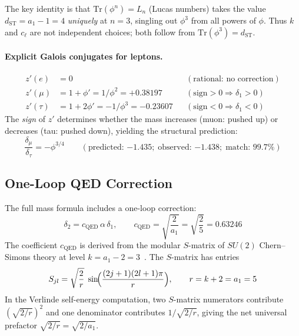 \documentclass[12pt,a4paper]{article}
\theoremstyle{definition}
\begin{document}
The key identity is that $\mathrm{Tr}(\phi^n) = L_n$ (Lucas numbers) takes the value $d_{\mathrm{ST}} = a_1 - 1 = 4$ \emph{uniquely} at $n = 3$, singling out $\phi^3$ from all powers of $\phi$.  Thus $k$ and $c_\ell$ are not independent choices; both follow from $\mathrm{Tr}(\phi^3) = d_{\mathrm{ST}}$.

\paragraph{Explicit Galois conjugates for leptons.}
\begin{align}
z'(e) &= 0 && (\text{rational: no correction}) \label{eq:zp_e} \\
z'(\mu) &= 1 + \phi' = 1/\phi^2 = +0.38197 && (\mathrm{sign} > 0 \Rightarrow \delta_1 > 0) \label{eq:zp_mu} \\
z'(\tau) &= 1 + 2\phi' = -1/\phi^3 = -0.23607 && (\mathrm{sign} < 0 \Rightarrow \delta_1 < 0) \label{eq:zp_tau}
\end{align}
The \emph{sign} of $z'$ determines whether the mass increases (muon: pushed up) or decreases (tau: pushed down), yielding the structural prediction:
\begin{equation}
\frac{\delta_\mu}{\delta_\tau} = -\phi^{3/4} \qquad (\text{predicted: } {-1.435};\;\text{observed: } {-1.438};\;\text{match: } 99.7\%)
\label{eq:ratio_prediction}
\end{equation}

\subsection{One-Loop QED Correction}

The full mass formula includes a one-loop correction:
\begin{equation}
\delta_2 = c_{\mathrm{QED}}\,\alpha\,\delta_1, \qquad c_{\mathrm{QED}} = \sqrt{\frac{2}{a_1}} = \sqrt{\frac{2}{5}} = 0.63246
\label{eq:oneloop}
\end{equation}
The coefficient $c_{\mathrm{QED}}$ is derived from the modular $S$-matrix of $SU(2)$ Chern--Simons theory at level $k = a_1 - 2 = 3$~\cite{Anghelina2026}.  The $S$-matrix has entries
\begin{equation}
S_{jl} = \sqrt{\frac{2}{r}}\;\sin\!\Bigl(\frac{(2j+1)(2l+1)\pi}{r}\Bigr), \qquad r = k + 2 = a_1 = 5
\end{equation}
In the Verlinde self-energy computation, two $S$-matrix numerators contribute $(\sqrt{2/r})^2$ and one denominator contributes $1/\sqrt{2/r}$, giving the net universal prefactor $\sqrt{2/r} = \sqrt{2/a_1}$.
\end{document}
